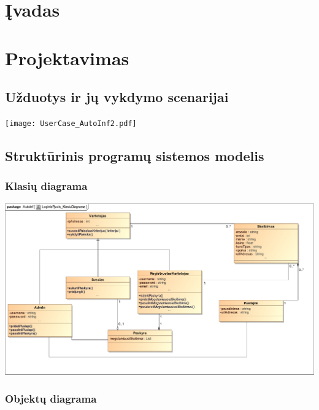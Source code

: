 \documentclass[12pt]{article}
\begin{document}
	\tableofcontents
	\newpage

	\section*{\hfil Įvadas \hfil}
	\newpage

	\section*{\hfil Projektavimas \hfil}
		\subsection*{\hfil Užduotys ir jų vykdymo scenarijai \hfil}
				\texttt{[image: UserCase\_AutoInf2.pdf]}

		\subsection*{\hfil Struktūrinis programų sistemos modelis \hfil}
			\subsubsection*{\hfil Klasių diagrama \hfil}
				\includegraphics[width = \textwidth, angle = 0]{LoginisPjuvis_KlasiuDiagrama2.pdf}

			\subsubsection*{\hfil Objektų diagrama \hfil}
				
\end{document}

